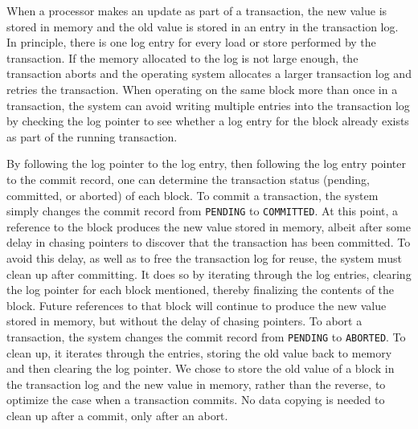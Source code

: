 
When a processor makes an update as part of a transaction, the new
value is stored in memory and the old value is stored in an entry in
the transaction log.  In principle, there is one log entry for every
load or store performed by the transaction.  If the memory allocated
to the log  is not large enough, the
transaction aborts and the operating system allocates a larger
transaction log and retries the transaction.  When
operating on the same block more than once in a transaction, the
system can avoid writing multiple entries into the transaction log by
checking the log pointer to see whether a log entry for the block
already exists as part of the running transaction.

By following the log pointer to the log entry, then following the log
entry pointer to the commit record, one can determine the transaction
status (pending, committed, or aborted) of each block.  To commit a
transaction, the system simply changes the commit record from
\texttt{PENDING} to \texttt{COMMITTED}.  At this point, a reference to
the block produces the new value stored in memory, albeit after some
delay in chasing pointers to discover that the transaction has been
committed.  To avoid this delay, as well as to free the transaction
log for reuse, the system must clean up after committing.  It does so
by iterating through the log entries, clearing the log pointer for
each block mentioned, thereby finalizing the contents of the block.
Future references to that block will continue to produce the new value
stored in memory, but without the delay of chasing pointers.  To abort
a transaction, the system changes the commit record from
\texttt{PENDING} to \texttt{ABORTED}.  To clean up, it iterates
through the entries, storing the old value back to memory and then
clearing the log pointer.  We chose to store the old value of a block
in the transaction log and the new value in memory, rather than the
reverse, to optimize the case when a transaction commits.  No data
copying is needed to clean up after a commit, only after an abort.


